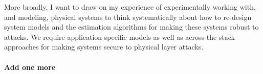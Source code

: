 \documentclass[10pt]{article}
\begin{document}
More broadly, I want to draw on my experience of experimentally
working with, and modeling, physical systems to think systematically
about how to re-design system models and the estimation algorithms for
making these systems robust to attacks. We require
application-specific models as well as across-the-stack approaches for
making systems secure to physical layer attacks.


\paragraph{Add one more}

\end{document}

